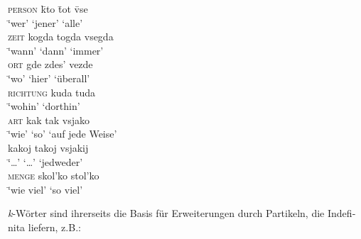 \documentclass[output=paper, colorlinks, citecolor=brown, booklanguage=german]{langscibook}
\begin{document}
\begin{otherlanguage}{german}
\ea\label{ex:02:ktv-reihe}
\begin{tabbing}
    \textsc{person}\hspace{1cm} \=  kto  \hspace{1cm}   \= tot  \hspace{1cm}    \=vse\\
    {}\hspace{2,1cm} \= ‘wer’ \> ‘jener’ \> ‘alle’ \\
    \textsc{zeit}               \>  kogda               \> togda                \> vsegda\\
    {}\hspace{2,1cm} \= ‘wann’ \> ‘dann’ \> ‘immer’ \\
    \textsc{ort}                \>  gde                 \> zdes'                \> vezde\\
    {}\hspace{2,1cm} \= ‘wo’ \> ‘hier’ \> ‘überall’ \\
    \textsc{richtung}           \>  kuda                \> tuda\\
    {}\hspace{2,1cm} \= ‘wohin’ \> ‘dorthin’  \\
    \textsc{art}                \>  kak                 \> tak                  \> vsjako\\
    {}\hspace{2,1cm} \= ‘wie’ \> ‘so’ \> ‘auf jede Weise’ \\
                                \>  kakoj               \> takoj                \> vsjakij\\
     {}\hspace{2,1cm} \= ‘…’ \> ‘…’ \> ‘jedweder’ \\                   
    \textsc{menge}              \>  skol'ko             \> stol'ko \\
    {}\hspace{2,1cm} \= ‘wie viel’ \> ‘so viel’  \\
\end{tabbing}
\z

\fi

\noindent \textit{k}-Wörter sind ihrerseits die Basis für Erweiterungen durch Partikeln, die Indefinita liefern, z.B.:



\end{otherlanguage}
\end{document}
